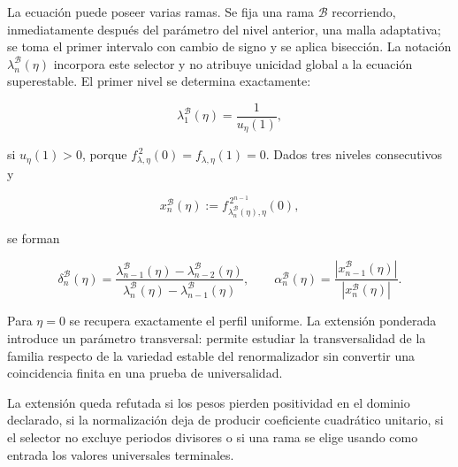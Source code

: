 La ecuación puede poseer varias ramas. Se fija una rama
\(\mathscr B\) recorriendo, inmediatamente después del parámetro del
nivel anterior, una malla adaptativa; se toma el primer intervalo con cambio
de signo y se aplica bisección. La notación
\(\lambda_n^{\mathscr B}(\eta)\) incorpora este selector y no atribuye
unicidad global a la ecuación superestable. El primer nivel se determina
exactamente:

\[
 \lambda_1^{\mathscr B}(\eta)=\frac1{u_\eta(1)},
\]

si \(u_\eta(1)>0\), porque
\(f_{\lambda,\eta}^{\,2}(0)=f_{\lambda,\eta}(1)=0\).
Dados tres niveles consecutivos y

\[
 x_n^{\mathscr B}(\eta)
 :=f_{\lambda_n^{\mathscr B}(\eta),\eta}^{\,2^{n-1}}(0),
\]

se forman

\begin{equation}
 \delta_n^{\mathscr B}(\eta)
 =\frac{\lambda_{n-1}^{\mathscr B}(\eta)-
         \lambda_{n-2}^{\mathscr B}(\eta)}
        {\lambda_n^{\mathscr B}(\eta)-
         \lambda_{n-1}^{\mathscr B}(\eta)},
 \qquad
 \alpha_n^{\mathscr B}(\eta)
 =\frac{|x_{n-1}^{\mathscr B}(\eta)|}
        {|x_n^{\mathscr B}(\eta)|}.
 \label{mab:eq:aproximantes-ponderados-armonizados}
\end{equation}

Para \(\eta=0\) se recupera exactamente el perfil uniforme. La
extensión ponderada introduce un parámetro transversal: permite estudiar
la transversalidad de la familia respecto de la variedad estable del
renormalizador sin convertir una coincidencia finita en una prueba de
universalidad.

\begin{remark}
La extensión queda refutada si los pesos pierden positividad en el dominio
declarado, si la normalización deja de producir coeficiente cuadrático
unitario, si el selector no excluye periodos divisores o si una rama se elige
usando como entrada los valores universales terminales.
\end{remark}
